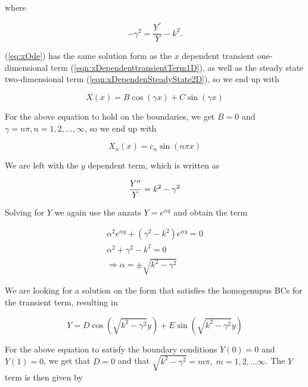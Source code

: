 \documentclass{article}
\begin{document}
where 

\begin{equation}\label{eq:gamma}
	-\gamma^2 = \frac{Y^{''}}{Y} - k^2.
\end{equation}

(\ref{eq:xOde}) has the same solution form as the $x$ dependent transient one-dimensional term (\ref{eqn:xDependenttransientTerm1D}), as well as the steady state two-dimensional term (\ref{eqn:xDependenSteadyState2D}), so we end up with 

\begin{equation}
X(x) = B\cos(\gamma x) + C\sin(\gamma x)
\end{equation}

For the above equation to hold on the boundaries, we get  $B=0$ and $\gamma = n\pi, n=1,2,...,\infty$, so we end up with

\begin{equation}
X_n(x) = c_n\sin(n\pi x)
\label{eqn:2DtransientXdependentTerm}
\end{equation}

We are left with the $y$ dependent term, which is written as 

\begin{subequations}
	\begin{equation}
	\frac{Y''}{Y} = k^2 - \gamma^2\\
	\end{equation}
\end{subequations}

Solving for $Y$ we again use the anzats $Y=e^{\alpha y}$ and obtain the term

\begin{subequations}
	\begin{eqnarray}
	\alpha^2 e^{\alpha y} + (\gamma^2 - k^2)e^{\alpha y} = 0 \\
	\alpha^2 + \gamma^2 - k^2 = 0 \\
	\Rightarrow \alpha = \pm \sqrt{k^2 - \gamma^2} 
	\end{eqnarray}
\end{subequations}

We are looking for a solution on the form that satisfies the homogenupus BCs for the transient term, resulting in

\begin{equation}
Y = D\cos(\sqrt{k^2 - \gamma^2}y) + E\sin(\sqrt{k^2 - \gamma^2}y)
\end{equation}

For the above equation to satisfy the boundary conditions $Y(0) = 0$ and $Y(1) = 0$, we get that $D = 0$ and that $\sqrt{k^2 - \gamma^2} = m\pi,\; m = 1,2,...\infty$. The $Y$ term is then given by
\end{document}
